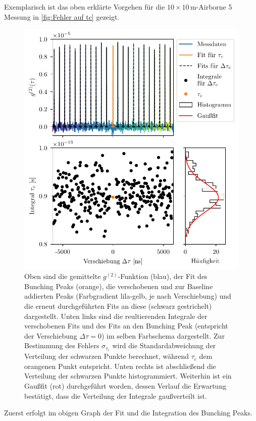 Exemplarisch ist das oben erklärte Vorgehen für die $10\times 10\,\mathrm{m}$-Airborne 5 Messung in \autoref{fig:Fehler auf tc} gezeigt. 
\begin{figure}[hp]
    \centering
    \includegraphics{images/Analysis/integration_error.pdf}
    \caption{Oben sind die gemittelte $g^{(2)}$-Funktion (blau), der Fit des Bunching Peaks (orange), die verschobenen und zur Baseline addierten Peaks (Farbgradient lila-gelb, je nach Verschiebung) und die erneut durchgeführten Fits an diese (schwarz gestrichelt) dargestellt. Unten links sind die reultierenden Integrale der verschobenen Fits und des Fits an den Bunching Peak (entspricht der Verschiebung $\Delta\tau=0$) im selben Farbschema dargestellt. Zur Bestimmung des Fehlers $\sigma_{\tau_c}$ wird die Standardabweichung der Verteilung der schwarzen Punkte berechnet, während $\tau_c$ dem orangenen Punkt entspricht. Unten rechts ist abschließend die Verteilung der schwarzen Punkte histogrammiert. Weiterhin ist ein Gaußfit (rot) durchgeführt worden, dessen Verlauf die Erwartung bestätigt, dass die Verteilung der Integrale gaußverteilt ist.}
    \label{fig:Fehler auf tc}
\end{figure}
Zuerst erfolgt im obigen Graph der Fit und die Integration des Bunching Peaks. 
